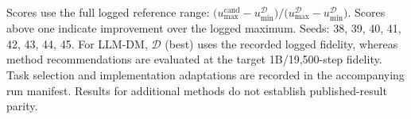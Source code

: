 \begin{table}
{\begin{tabular}{lcccccccccccc}
\bottomrule
\end{tabular}%
}
\par\vspace{0.5em}
\begin{minipage}{0.98\textwidth}
\footnotesize
Scores use the full logged reference range: $\bigl(u_{\max}^{\mathrm{cand}}-u_{\min}^{\mathcal{D}}\bigr) / \bigl(u_{\max}^{\mathcal{D}}-u_{\min}^{\mathcal{D}}\bigr)$. Scores above one indicate improvement over the logged maximum. Seeds: 38, 39, 40, 41, 42, 43, 44, 45. For LLM-DM, $\mathcal{D}$ (best) uses the recorded logged fidelity, whereas method recommendations are evaluated at the target 1B/19,500-step fidelity. Task selection and implementation adaptations are recorded in the accompanying run manifest. Results for additional methods do not establish published-result parity.
\end{minipage}
\end{table}
